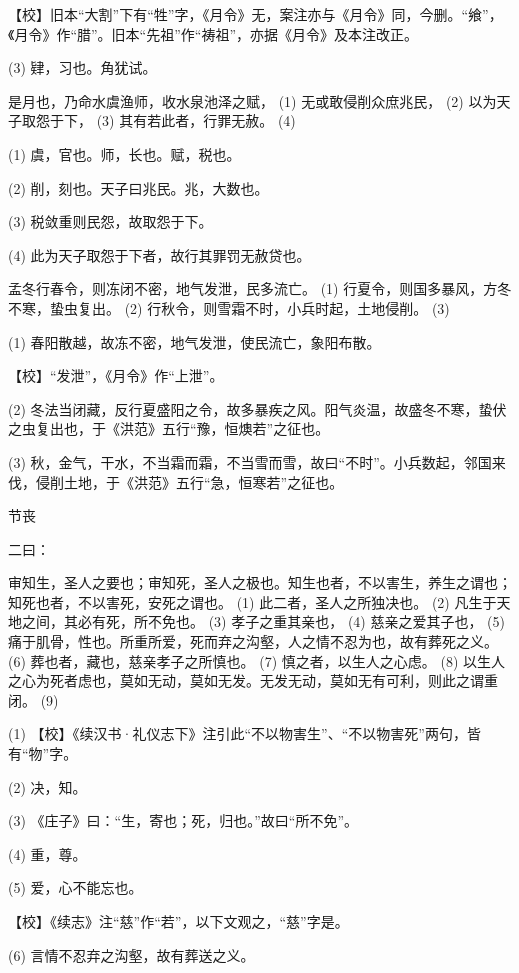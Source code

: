 \documentclass[12pt,UTF8]{ctexbook}
\begin{document}
【校】旧本“大割”下有“牲”字，《月令》无，案注亦与《月令》同，今删。“飨”，《月令》作“腊”。旧本“先祖”作“祷祖”，亦据《月令》及本注改正。

(3) 肄，习也。角犹试。

是月也，乃命水虞渔师，收水泉池泽之赋， (1) 无或敢侵削众庶兆民， (2) 以为天子取怨于下， (3) 其有若此者，行罪无赦。 (4)

(1) 虞，官也。师，长也。赋，税也。

(2) 削，刻也。天子曰兆民。兆，大数也。

(3) 税敛重则民怨，故取怨于下。

(4) 此为天子取怨于下者，故行其罪罚无赦贷也。

孟冬行春令，则冻闭不密，地气发泄，民多流亡。 (1) 行夏令，则国多暴风，方冬不寒，蛰虫复出。 (2) 行秋令，则雪霜不时，小兵时起，土地侵削。 (3)

(1) 春阳散越，故冻不密，地气发泄，使民流亡，象阳布散。

【校】“发泄”，《月令》作“上泄”。

(2) 冬法当闭藏，反行夏盛阳之令，故多暴疾之风。阳气炎温，故盛冬不寒，蛰伏之虫复出也，于《洪范》五行“豫，恒燠若”之征也。

(3) 秋，金气，干水，不当霜而霜，不当雪而雪，故曰“不时”。小兵数起，邻国来伐，侵削土地，于《洪范》五行“急，恒寒若”之征也。





节丧


二曰：

审知生，圣人之要也；审知死，圣人之极也。知生也者，不以害生，养生之谓也；知死也者，不以害死，安死之谓也。 (1) 此二者，圣人之所独决也。 (2) 凡生于天地之间，其必有死，所不免也。 (3) 孝子之重其亲也， (4) 慈亲之爱其子也， (5) 痛于肌骨，性也。所重所爱，死而弃之沟壑，人之情不忍为也，故有葬死之义。 (6) 葬也者，藏也，慈亲孝子之所慎也。 (7) 慎之者，以生人之心虑。 (8) 以生人之心为死者虑也，莫如无动，莫如无发。无发无动，莫如无有可利，则此之谓重闭。 (9)

(1) 【校】《续汉书·礼仪志下》注引此“不以物害生”、“不以物害死”两句，皆有“物”字。

(2) 决，知。

(3) 《庄子》曰：“生，寄也；死，归也。”故曰“所不免”。

(4) 重，尊。

(5) 爱，心不能忘也。

【校】《续志》注“慈”作“若”，以下文观之，“慈”字是。

(6) 言情不忍弃之沟壑，故有葬送之义。
\end{document}
